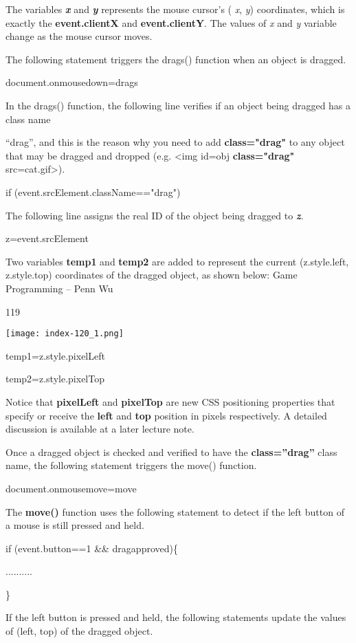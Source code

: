 \documentclass[
]{article}
\begin{document}
The variables \emph{\textbf{x}} and \emph{\textbf{y}} represents the
mouse cursor's ( \emph{x}, \emph{y}) coordinates, which is exactly the
\textbf{event.clientX} and \textbf{event.clientY}. The values of
\emph{x} and \emph{y} variable change as the mouse cursor moves.

The following statement triggers the drags() function when an object is
dragged.

document.onmousedown=drags

In the drags() function, the following line verifies if an object being
dragged has a class name

``drag'', and this is the reason why you need to add
\textbf{class="drag"} to any object that may be dragged and dropped
(e.g. \textless img id=obj \textbf{class="drag"}
src=cat.gif\textgreater).

if (event.srcElement.className=="drag")

The following line assigns the real ID of the object being dragged to
\emph{\textbf{z}}.

z=event.srcElement

Two variables \textbf{temp1} and \textbf{temp2} are added to represent
the current (z.style.left, z.style.top) coordinates of the dragged
object, as shown below: Game Programming -- Penn Wu

119

\protect\hypertarget{index_split_008.htmlux5cux23p120}{}{}\texttt{[image: index-120\_1.png]}

temp1=z.style.pixelLeft

temp2=z.style.pixelTop

Notice that \textbf{pixelLeft} and \textbf{pixelTop} are new CSS
positioning properties that specify or receive the \textbf{left} and
\textbf{top} position in pixels respectively. A detailed discussion is
available at a later lecture note.

Once a dragged object is checked and verified to have the
\textbf{class=''drag''} class name, the following statement triggers the
move() function.

document.onmousemove=move

The \textbf{move()} function uses the following statement to detect if
the left button of a mouse is still pressed and held.

if (event.button==1 \&\& dragapproved)\{

..........

\}

If the left button is pressed and held, the following statements update
the values of (left, top) of the dragged object.
\end{document}

